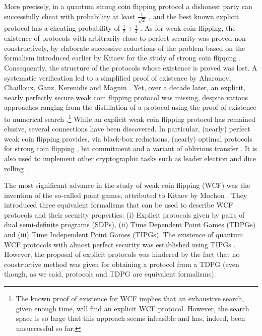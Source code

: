 \documentclass{theoretics}
\begin{document}
More precisely, in a quantum strong coin flipping protocol a dishonest party can successfully cheat with probability at least $\frac{1}{\sqrt{2}}$ \cite{Kitaev03}, and
the best known explicit protocol %
has a cheating probability of $\frac{1}{2}+\frac{1}{4}$
\cite{Ambainis04b}. As for weak coin flipping, the existence of
protocols with arbitrarily-close-to-perfect security was
proved non-constructively, by elaborate successive reductions of the problem based on
the formalism introduced earlier by  Kitaev for the study of strong
coin flipping \cite{Kitaev03}. Consequently, the structure of the protocols whose existence
is proved was lost. A systematic verification led to a simplified proof of existence by  Aharonov, Chailloux, Ganz, Kerenidis and Magnin \cite{ACG+14}. Yet, over a decade later, an explicit, nearly perfectly secure weak coin flipping protocol was missing, despite various approaches ranging
from the distillation of a protocol using the proof of existence to
numerical search \cite{NST14,Nayak2015}.\footnote{%
  The known proof of existence for WCF implies that an exhaustive search, given enough time, will find an explicit WCF protocol. However, the search space is so large that this approach seems infeasible and has, indeed, been unsuccessful so far.}
%
While an explicit weak coin flipping protocol has remained elusive, several connections have been discovered.
In particular, (nearly) perfect weak coin flipping
provides, via black-box reductions, (nearly) optimal protocols for strong coin flipping \cite{CK09}, bit commitment \cite{CK11} and a variant of oblivious transfer \cite{Chailloux2013a}. It is also used to implement other cryptographic tasks
such as leader election \cite{Ganz2009} and dice rolling \cite{Aharon2010}.


%
The most significant advance in the study of weak coin flipping (WCF) was the invention
of the so-called point games, attributed to Kitaev  by Mochon \cite{Mochon07}.
%
They introduced three equivalent formalisms that can be used to describe
WCF protocols and their security properties: (i) Explicit protocols given by pairs of dual semi-definite programs (SDPs),
(ii) Time Dependent Point Games (TDPGs) and (iii) Time Independent Point Games
(TIPGs). The existence of quantum WCF protocols with almost perfect security was established using  TIPGs \cite{Mochon07}. However, the proposal of explicit protocols was hindered by the fact that no constructive method was given for obtaining a
protocol from a TDPG (even though, as we said, protocols and TDPG are equivalent formalisms).
\end{document}
